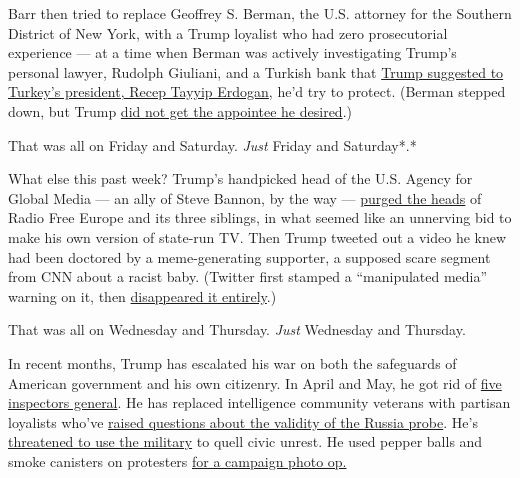 Barr then tried to replace Geoffrey S. Berman, the U.S. attorney for the
Southern District of New York, with a Trump loyalist who had zero
prosecutorial experience --- at a time when Berman was actively
investigating Trump's personal lawyer, Rudolph Giuliani, and a Turkish
bank that
\href{https://abcnews.go.com/Politics/bolton-suggests-obstruction-trump-sdny-turkey-investigation/story?id=71362785}{Trump
suggested to Turkey's president, Recep Tayyip Erdogan}, he'd try to
protect. (Berman stepped down, but Trump
\href{https://www.nytimes.com/2020/06/20/nyregion/trump-geoffrey-berman-fired-sdny.html?action=click\&module=Top\%20Stories\&pgtype=Homepage}{did
not get the appointee he desired}.)

That was all on Friday and Saturday. \emph{Just} Friday and Saturday*.*

What else this past week? Trump's handpicked head of the U.S. Agency for
Global Media --- an ally of Steve Bannon, by the way ---
\href{https://www.nytimes.com/2020/06/17/us/politics/michael-pack-media-agency.htm}{purged
the heads} of Radio Free Europe and its three siblings, in what seemed
like an unnerving bid to make his own version of state-run TV. Then
Trump tweeted out a video he knew had been doctored by a meme-generating
supporter, a supposed scare segment from CNN about a racist baby.
(Twitter first stamped a ``manipulated media'' warning on it, then
\href{https://www.npr.org/sections/live-updates-protests-for-racial-justice/2020/06/19/880805065/twitter-flags-video-shared-by-trump-as-manipulated-media}{disappeared
it entirely}.)

That was all on Wednesday and Thursday. \emph{Just} Wednesday and
Thursday.

In recent months, Trump has escalated his war on both the safeguards of
American government and his own citizenry. In April and May, he got rid
of
\href{https://www.vox.com/2020/5/28/21265799/inspectors-general-trump-linick-atkinson}{five
inspectors general}. He has replaced intelligence community veterans
with partisan loyalists who've
\href{https://www.voanews.com/usa/trump-loyalist-confirmed-director-national-intelligence}{raised
questions about the validity of the Russia probe}. He's
\href{https://www.washingtonpost.com/national-security/can-trump-use-military-to-stop-protests-insurrection-act/2020/06/01/c3724380-a46b-11ea-b473-04905b1af82b_story.html}{threatened
to use the military} to quell civic unrest. He used pepper balls and
smoke canisters on protesters
\href{https://www.vox.com/2020/6/5/21281604/lafayette-square-white-house-tear-gas-protest}{for
a campaign photo op.}

